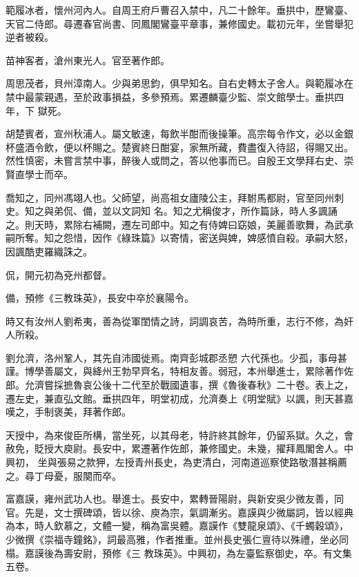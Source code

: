 \begin{pinyinscope}
 範履冰者，懷州河內人。自周王府戶曹召入禁中，凡二十餘年。垂拱中，歷鸞臺、天官二侍郎。尋遷春官尚書、同鳳閣鸞臺平章事，兼修國史。載初元年，坐嘗舉犯逆者被殺。



 苗神客者，滄州東光人。官至著作郎。



 周思茂者，貝州漳南人。少與弟思鈞，俱早知名。自右史轉太子舍人。與範履冰在禁中最蒙親遇，至於政事損益，多參預焉。累遷麟臺少監、崇文館學士。垂拱四年，下
 獄死。



 胡楚賓者，宣州秋浦人。屬文敏速，每飲半酣而後操筆。高宗每令作文，必以金銀杯盛酒令飲，便以杯賜之。楚賓終日酣宴，家無所藏，費盡復入待詔，得賜又出。然性慎密，未嘗言禁中事，醉後人或問之，答以他事而已。自殷王文學拜右史、崇賢直學士而卒。



 喬知之，同州馮翊人也。父師望，尚高祖女廬陵公主，拜駙馬都尉，官至同州刺史。知之與弟侃、備，並以文詞知
 名。知之尤稱俊才，所作篇詠，時人多諷誦之。則天時，累除右補闕，遷左司郎中。知之有侍婢曰窈娘，美麗善歌舞，為武承嗣所奪。知之怨惜，因作《綠珠篇》以寄情，密送與婢，婢感憤自殺。承嗣大怒，因諷酷吏羅織誅之。



 侃，開元初為兗州都督。



 備，預修《三教珠英》，長安中卒於襄陽令。



 時又有汝州人劉希夷，善為從軍閨情之詩，詞調哀苦，為時所重，志行不修，為奸人所殺。



 劉允濟，洛州鞏人，其先自沛國徙焉。南齊彭城郡丞愬
 六代孫也。少孤，事母甚謹。博學善屬文，與絳州王勃早齊名，特相友善。弱冠，本州舉進士，累除著作佐郎。允濟嘗採摭魯哀公後十二代至於戰國遺事，撰《魯後春秋》二十卷。表上之，遷左史，兼直弘文館。垂拱四年，明堂初成，允濟奏上《明堂賦》以諷，則天甚嘉嘆之，手制褒美，拜著作郎。



 天授中，為來俊臣所構，當坐死，以其母老，特許終其餘年，仍留系獄。久之，會赦免，貶授大庾尉。長安中，累遷著作佐郎，兼修國史。未幾，擢拜鳳閣舍人。中興初，
 坐與張易之款狎，左授青州長史，為吏清白，河南道巡察使路敬潛甚稱薦之。尋丁母憂，服闋而卒。



 富嘉謨，雍州武功人也。舉進士。長安中，累轉晉陽尉，與新安吳少微友善，同官。先是，文士撰碑頌，皆以徐、庾為宗，氣調漸劣。嘉謨與少微屬詞，皆以經典為本，時人欽慕之，文體一變，稱為富吳體。嘉謨作《雙龍泉頌》、《千蠋穀頌》，少微撰《崇福寺鐘銘》，詞最高雅，作者推重。並州長史張仁亶待以殊禮，坐必同榻。嘉謨後為壽安尉，預修《三
 教珠英》。中興初，為左臺監察御史，卒。有文集五卷。




\end{pinyinscope}
